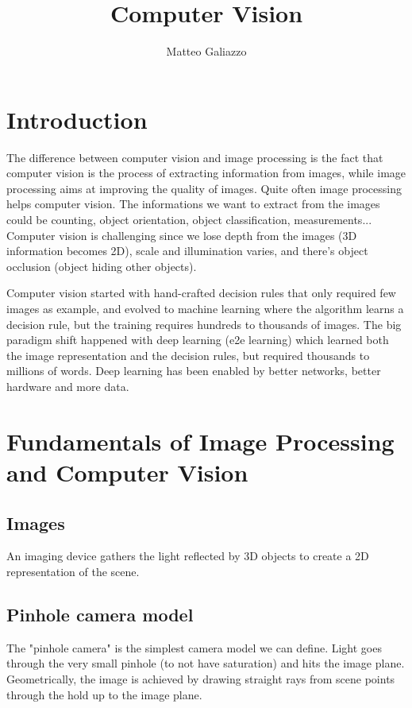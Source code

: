 \documentclass{article}
\title{Computer Vision}
\author{Matteo Galiazzo}
\begin{document}
\maketitle

\tableofcontents


\section{Introduction}

The difference between computer vision and image processing is the fact that computer vision is the process of extracting information from images, while image processing aims at improving the quality of images.
Quite often image processing helps computer vision.
The informations we want to extract from the images could be counting, object orientation, object classification, measurements...
Computer vision is challenging since we lose depth from the images (3D information becomes 2D), scale and illumination varies, and there's object occlusion (object hiding other objects).

Computer vision started with hand-crafted decision rules that only required few images as example, and evolved to machine learning where the algorithm learns a decision rule, but the training requires hundreds to thousands of images.
The big paradigm shift happened with deep learning (e2e learning) which learned both the image representation and the decision rules, but required thousands to millions of words.
Deep learning has been enabled by better networks, better hardware and more data.


\section{Fundamentals of Image Processing and Computer Vision}

\subsection{Images}

An imaging device gathers the light reflected by 3D objects to create a 2D representation of the scene.

\subsection{Pinhole camera model}
The "pinhole camera" is the simplest camera model we can define.
Light goes through the very small pinhole (to not have saturation) and hits the image plane.
Geometrically, the image is achieved by drawing straight rays from scene points through the hold up to the image plane.
\end{document}
